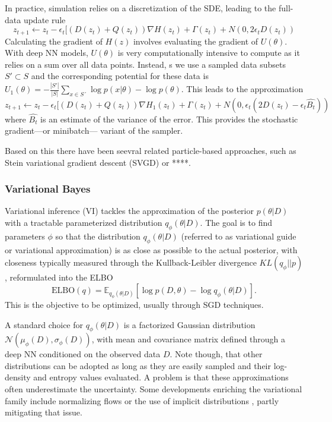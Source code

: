 In practice, simulation relies on a discretization of the SDE, leading to the full-data update rule
\begin{equation}
z_{t+1} \leftarrow z_t - \epsilon_t [ ( D(z_t) + Q(z_t) )
\nabla H(z_t) + \Gamma (z_t)
+ N (0, 2\epsilon _t D(z_t))
\end{equation} 
Calculating the gradient of $H(z)$ involves evaluating the gradient of $U(\theta )$. With deep NN models, 
 $U(\theta )$ is very computationally intensive to compute 
 as it relies on a sum
over all data points. Instead, s
we use a sampled data subsets $S' \subset S$ and the corresponding potential for these data is
$U_1 (\theta ) = −\frac{|S'|}{|S|} \sum _{x \in S´}
\log p(x|\theta ) − \log p(\theta )$.
This leads to the approximation 
\begin{equation}
z_{t+1} \leftarrow z_t - \epsilon_t [ ( D(z_t) + Q(z_t) )
\nabla H_1 (z_t) + \Gamma (z_t)
+ N (0, \epsilon _t (2 D(z_t)- \epsilon_t \hat {B_t}))
\end{equation} 
where $\hat {B_t}$ is an estimate of the variance of the error.
This provides the  stochastic gradient—or minibatch— variant of the sampler. 

Based on this there have been seevral related particle-based approaches, such as Stein variational gradient descent (SVGD) \cite{liu2016stein}
or ****.

\subsubsection{Variational Bayes} 

Variational inference (VI) \citep{blei2017variational} tackles the 
 approximation of the posterior $p(\theta | D)$ with a tractable parameterized distribution $q_{\phi}(\theta |D)$. The goal is to find parameters $\phi$ so that the distribution 
$q_{\phi}(\theta |D )$  (referred to as variational guide
or variational approximation)  is as close as possible to the actual posterior, with closeness typically measured through 
the Kullback-Leibler 
divergence $KL(q_{\phi } || p)$, reformulated into the ELBO
\begin{equation}\label{eq:elbo}
\mbox{ELBO}(q) = \mathbb{E}_{q_{\phi}(\theta |D)} \left[ \log p(D,\theta ) - \log q_{\phi}(\theta |D)\right].
\end{equation}
This is the objective to be optimized,
usually through SGD techniques. 

A standard choice
for $q_{\phi}(\theta |D )$ is a factorized Gaussian 
distribution $\mathcal{N}(\mu_{\phi}(D), \sigma_{\phi}(D))$,
with  mean and covariance matrix defined through a
 deep NN conditioned on the observed data $D$.
 Note though, that 
other distributions can be adopted as long as they 
 are easily sampled and their log-density and entropy values evaluated. 
A problem is that these approximations often 
underestimate the uncertainty. Some developments
 enriching the variational family include normalizing flows \citep{rezende2015variational} or the use of implicit distributions \citep{huszar2017variational}, partly 
mitigating that issue.

